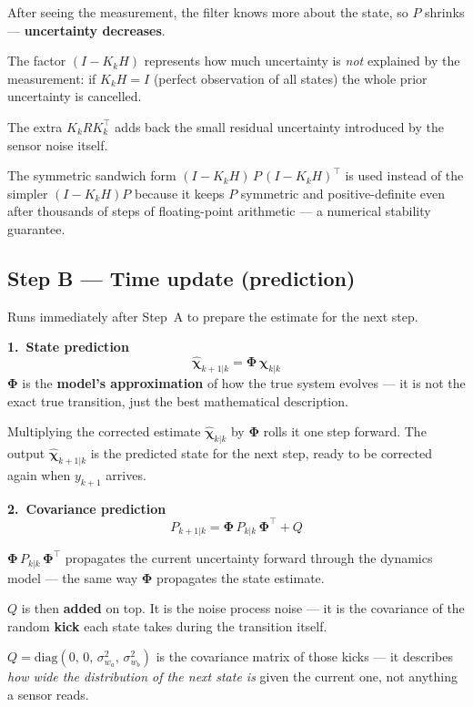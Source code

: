\documentclass[12pt, a4paper]{article}
\begin{document}
After seeing the measurement, the filter knows more about the state,
so $P$ shrinks --- \textbf{uncertainty decreases}.

The factor $(I - K_k H)$ represents how much uncertainty is
\emph{not} explained by the measurement: if $K_k H = I$ (perfect
observation of all states) the whole prior uncertainty is cancelled.

The extra $K_k R K_k^\top$ adds back the small residual uncertainty
introduced by the sensor noise itself.

\begin{notebox}
    The symmetric sandwich form $(I-K_kH)\,P\,(I-K_kH)^\top$ is used
instead of the simpler $(I-K_kH)P$ because it keeps $P$ symmetric
and positive-definite even after thousands of steps of floating-point
arithmetic --- a numerical stability guarantee.
\end{notebox}

\subsection*{Step B --- Time update (prediction)}
Runs immediately after Step~A to prepare the estimate for the next step.

\medskip
\textbf{1.\ State prediction}
\[
  \hat{\boldsymbol{\chi}}_{k+1|k} = \boldsymbol{\Phi}\,\hat{\boldsymbol{\chi}}_{k|k}
\]
$\boldsymbol{\Phi}$ is the \textbf{model's approximation} of how the
true system evolves --- it is not the exact true transition, just the
best mathematical description.

Multiplying the corrected estimate $\hat{\boldsymbol{\chi}}_{k|k}$ by $\boldsymbol{\Phi}$ rolls it
one step forward. The output $\hat{\boldsymbol{\chi}}_{k+1|k}$ is the predicted state
for the next step, ready to be corrected again when $y_{k+1}$ arrives.

\medskip
\textbf{2.\ Covariance prediction}
\[
  P_{k+1|k} = \boldsymbol{\Phi}\,P_{k|k}\,\boldsymbol{\Phi}^\top + Q
\]

$\boldsymbol{\Phi}\,P_{k|k}\,\boldsymbol{\Phi}^\top$ propagates the
current uncertainty forward through the dynamics model --- the same way
$\boldsymbol{\Phi}$ propagates the state estimate.

$Q$ is then \textbf{added} on top.
It is the noise process noise --- it is the covariance of the random
\textbf{kick} each state takes during the transition itself.

$Q = \mathrm{diag}(0,\,0,\,\sigma_{w_a}^2,\,\sigma_{w_b}^2)$ is the
covariance matrix of those kicks --- it describes \emph{how wide the
distribution of the next state is} given the current one, not anything
a sensor reads.
\end{document}
